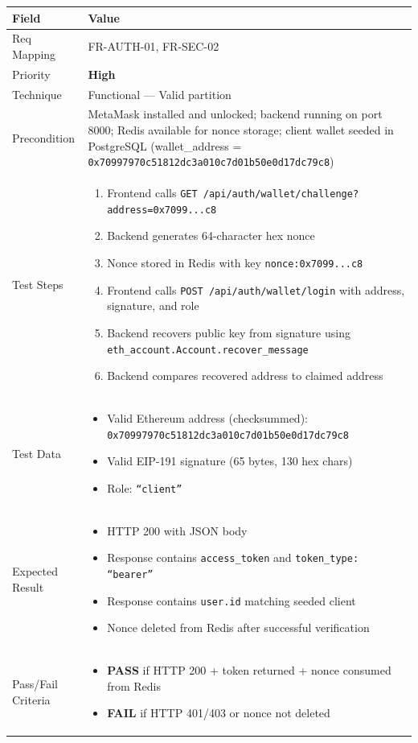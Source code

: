 \documentclass[12pt,a4paper]{article}
\newcommand{\sevhigh}{\textcolor{severityhigh}{\textbf{High}}}
\newcommand{\passresult}{\textcolor{passgreen}{\textbf{PASS}}}
\newcommand{\failresult}{\textcolor{failred}{\textbf{FAIL}}}
\begin{document}
\begin{tabular}{|p{}|p{}|}
\hline
\rowcolor{lightblue} \textbf{Field} & \textbf{Value} \\
\hline
Req Mapping & FR-AUTH-01, FR-SEC-02 \\
\hline
Priority & \sevhigh \\
\hline
Technique & Functional --- Valid partition \\
\hline
Precondition & MetaMask installed and unlocked; backend running on port 8000; Redis available for nonce storage; client wallet seeded in PostgreSQL (wallet\_address = \texttt{0x70997970c51812dc3a010c7d01b50e0d17dc79c8}) \\
\hline
Test Steps &
\begin{enumerate}[nosep, leftmargin=*]
  \item Frontend calls \texttt{GET /api/auth/wallet/challenge?address=0x7099...c8}
  \item Backend generates 64-character hex nonce
  \item Nonce stored in Redis with key \texttt{nonce:0x7099...c8}
  \item Frontend calls \texttt{POST /api/auth/wallet/login} with address, signature, and role
  \item Backend recovers public key from signature using \texttt{eth\_account.Account.recover\_message}
  \item Backend compares recovered address to claimed address
\end{enumerate} \\
\hline
Test Data &
\begin{itemize}[nosep, leftmargin=*]
  \item Valid Ethereum address (checksummed): \texttt{0x70997970c51812dc3a010c7d01b50e0d17dc79c8}
  \item Valid EIP-191 signature (65 bytes, 130 hex chars)
  \item Role: \texttt{``client''}
\end{itemize} \\
\hline
Expected Result &
\begin{itemize}[nosep, leftmargin=*]
  \item HTTP 200 with JSON body
  \item Response contains \texttt{access\_token} and \texttt{token\_type: ``bearer''}
  \item Response contains \texttt{user.id} matching seeded client
  \item Nonce deleted from Redis after successful verification
\end{itemize} \\
\hline
Pass/Fail Criteria &
\begin{itemize}[nosep, leftmargin=*]
  \item \passresult{} if HTTP 200 + token returned + nonce consumed from Redis
  \item \failresult{} if HTTP 401/403 or nonce not deleted
\end{itemize} \\
\hline
\end{tabular}
\end{document}
